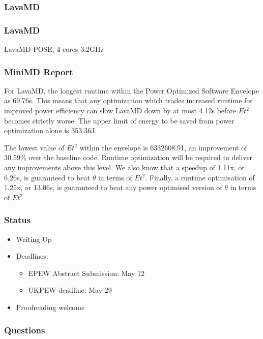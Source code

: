 \documentclass{beamer}
\begin{document}
  \begin{frame}
    \frametitle{LavaMD}
    \begin{figure}
    
    \end{figure}
  \end{frame}
  \begin{frame}
    \frametitle{LavaMD}
    \begin{table}
    
    \caption{LavaMD POSE, 4 cores 3.2GHz}
    \end{table} 
  \end{frame}

  \begin{frame}
    \frametitle{MiniMD Report}
For LavaMD, the longest runtime within the Power Optimized Software Envelope as 69.76s.
This means that any optimization which trades increased runtime for improved power efficiency can slow LavaMD down by at most 4.12s before $Et^2$ becomes strictly worse.
The upper limit of energy to be saved from power optimization alone is 353.36J.

The lowest value of $Et^2$ within the envelope is 6332608.91, an improvement of 30.59\% over the baseline code.
Runtime optimization will be required to deliver any improvements above this level.
We also know that a speedup of 1.11x, or 6.26s, is guaranteed to beat $\theta$ in terms of $Et^2$.
Finally, a runtime optimisation of 1.25x, or 13.06s, is guaranteed to beat any power optimised version of $\theta$ in terms of $Et^2$ 
\end{frame}

  \begin{frame}
    \frametitle{Status}
    \begin{itemize}
    \item Writing Up
    \item Deadlines:
    \begin{itemize}
      \item EPEW Abstract Submission: May 12 
      \item UKPEW deadline: May 29
    \end{itemize}
    \item Proofreading welcome
    \end{itemize}
  \end{frame}


  \begin{frame}
    \frametitle{Questions}
  \end{frame}
\end{document}
